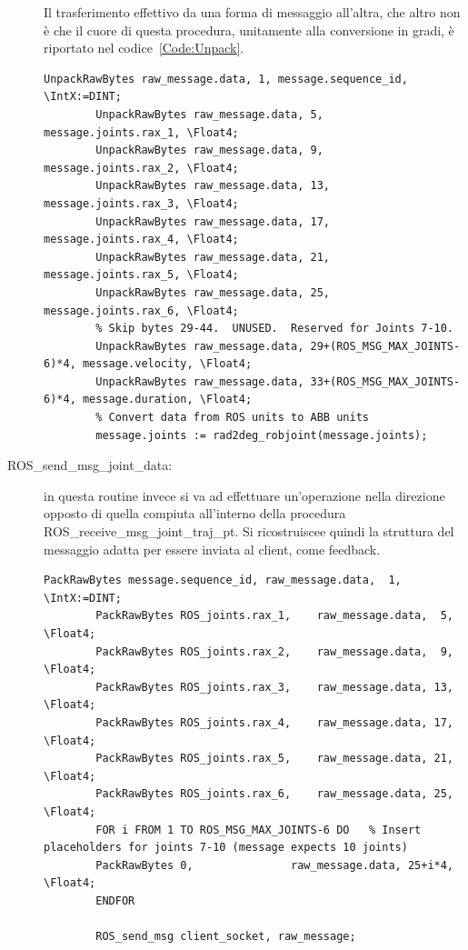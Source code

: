 \begin{description}
	Il trasferimento effettivo da una forma di messaggio all'altra, che altro non è che il cuore di questa procedura, unitamente alla conversione in gradi, è riportato nel codice~\vref{Code:Unpack}.
	\begin{lstlisting}[style=Matlab-editor,caption=Unpacking del messaggio ricevuto dal client,captionpos=b,label={Code:Unpack}, basicstyle=\tiny\ttfamily,frame=trBL]	
		UnpackRawBytes raw_message.data, 1, message.sequence_id, \IntX:=DINT;
		UnpackRawBytes raw_message.data, 5, message.joints.rax_1, \Float4;
		UnpackRawBytes raw_message.data, 9, message.joints.rax_2, \Float4;
		UnpackRawBytes raw_message.data, 13, message.joints.rax_3, \Float4;
		UnpackRawBytes raw_message.data, 17, message.joints.rax_4, \Float4;
		UnpackRawBytes raw_message.data, 21, message.joints.rax_5, \Float4;
		UnpackRawBytes raw_message.data, 25, message.joints.rax_6, \Float4;
		% Skip bytes 29-44.  UNUSED.  Reserved for Joints 7-10.
		UnpackRawBytes raw_message.data, 29+(ROS_MSG_MAX_JOINTS-6)*4, message.velocity, \Float4;
		UnpackRawBytes raw_message.data, 33+(ROS_MSG_MAX_JOINTS-6)*4, message.duration, \Float4;
		% Convert data from ROS units to ABB units
		message.joints := rad2deg_robjoint(message.joints);
	\end{lstlisting}
	\item[ROS\_send\_msg\_joint\_data:] in questa routine invece si va ad effettuare un'operazione nella direzione opposto di quella compiuta all'interno della procedura ROS\_receive\_msg\_joint\_traj\_pt. Si ricostruiscee quindi la struttura del messaggio adatta per essere inviata al client, come feedback.   
	\begin{lstlisting}[style=Matlab-editor,caption=Packing del messaggio per spedizione verso il client come mezzo di feedback,captionpos=b,label={Code:Pack}, basicstyle=\tiny\ttfamily,frame=trBL]	
		PackRawBytes message.sequence_id, raw_message.data,  1, \IntX:=DINT;
		PackRawBytes ROS_joints.rax_1,    raw_message.data,  5, \Float4;
		PackRawBytes ROS_joints.rax_2,    raw_message.data,  9, \Float4;
		PackRawBytes ROS_joints.rax_3,    raw_message.data, 13, \Float4;
		PackRawBytes ROS_joints.rax_4,    raw_message.data, 17, \Float4;
		PackRawBytes ROS_joints.rax_5,    raw_message.data, 21, \Float4;
		PackRawBytes ROS_joints.rax_6,    raw_message.data, 25, \Float4;
		FOR i FROM 1 TO ROS_MSG_MAX_JOINTS-6 DO   % Insert placeholders for joints 7-10 (message expects 10 joints)
		PackRawBytes 0,               raw_message.data, 25+i*4, \Float4;
		ENDFOR
		
		ROS_send_msg client_socket, raw_message;
	\end{lstlisting}
\end{description}
